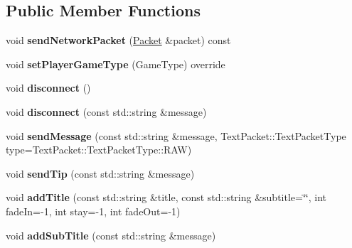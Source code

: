 \subsection*{Public Member Functions}
\begin{DoxyCompactItemize}
\item 
\mbox{\label{struct_server_player_a52f056561e1957e717cd43992cf973ee}} 
void {\bfseries send\+Network\+Packet} (\mbox{\hyperlink{struct_packet}{Packet}} \&packet) const
\item 
\mbox{\label{struct_server_player_a1d3c0c52b1e12655dd227516316f6e3d}} 
void {\bfseries set\+Player\+Game\+Type} (Game\+Type) override
\item 
\mbox{\label{struct_server_player_a9e949a29f3bd590a6a2cddd4fb6e9172}} 
void {\bfseries disconnect} ()
\item 
\mbox{\label{struct_server_player_a21c8b35cb3b9bc55b5e11555a32c9d11}} 
void {\bfseries disconnect} (const std\+::string \&message)
\item 
\mbox{\label{struct_server_player_a217037a7cb334f0ab072ea7ab7d8a052}} 
void {\bfseries send\+Message} (const std\+::string \&message, Text\+Packet\+::\+Text\+Packet\+Type type=Text\+Packet\+::\+Text\+Packet\+Type\+::\+R\+AW)
\item 
\mbox{\label{struct_server_player_a7ebd5d5e6fe1a05cc319a4fe477e83ef}} 
void {\bfseries send\+Tip} (const std\+::string \&message)
\item 
\mbox{\label{struct_server_player_a4cd727214ecd0e21e0f32cf8e3346c22}} 
void {\bfseries add\+Title} (const std\+::string \&title, const std\+::string \&subtitle=\char`\"{}\char`\"{}, int fade\+In=-\/1, int stay=-\/1, int fade\+Out=-\/1)
\item 
\mbox{\label{struct_server_player_a1f5c3607ff790a068632fb816f7ed0e8}} 
void {\bfseries add\+Sub\+Title} (const std\+::string \&message)
\item 
\mbox{\label{struct_server_player_acf4943f5cfc6d03e1a0bddf266aee0cc}} 

\end{DoxyCompactItemize}
